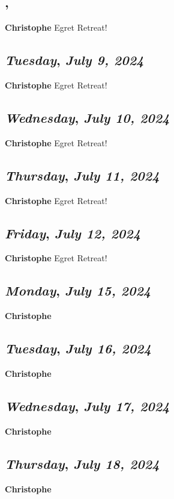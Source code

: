 \subsection*{\weekday, \day}
\textbf {Christophe}
Egret Retreat!
\def\day{\textit{July 9, 2024}}
\def\weekday{\textit{Tuesday}}
\subsection*{\weekday, \day}
\textbf {Christophe}
Egret Retreat!
\def\day{\textit{July 10, 2024}}
\def\weekday{\textit{Wednesday}}
\subsection*{\weekday, \day}
\textbf {Christophe}
Egret Retreat!
\def\day{\textit{July 11, 2024}}
\def\weekday{\textit{Thursday}}
\subsection*{\weekday, \day}
\textbf {Christophe}
Egret Retreat!
\def\day{\textit{July 12, 2024}}
\def\weekday{\textit{Friday}}
\subsection*{\weekday, \day}
\textbf {Christophe}
Egret Retreat!

\def\day{\textit{July 15, 2024}}
\def\weekday{\textit{Monday}}
\subsection*{\weekday, \day}
\textbf {Christophe}

\def\day{\textit{July 16, 2024}}
\def\weekday{\textit{Tuesday}}
\subsection*{\weekday, \day}
\textbf {Christophe}

\def\day{\textit{July 17, 2024}}
\def\weekday{\textit{Wednesday}}
\subsection*{\weekday, \day}
\textbf {Christophe}

\def\day{\textit{July 18, 2024}}
\def\weekday{\textit{Thursday}}
\subsection*{\weekday, \day}
\textbf {Christophe}

